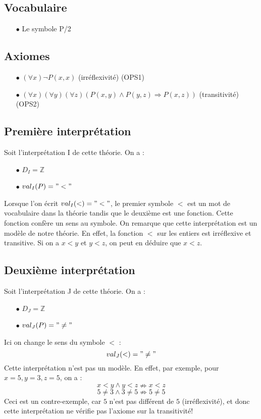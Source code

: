 \subsection*{Vocabulaire}
\begin{itemize}
\item[$\bullet$] Le symbole P/2
\end{itemize}
\subsection*{Axiomes}
\begin{itemize}
\item[$\bullet$] $ (\forall x) \neg P(x,x) $  (irréflexivité) (OPS1)
\item[$\bullet$] $ (\forall x) (\forall y) (\forall z) (P(x,y) \wedge P(y,z) \Rightarrow P(x,z))$ (transitivité) (OPS2)
\end{itemize}
\subsection*{Première interprétation}
Soit l'interprétation I de cette théorie. On a :
\begin{itemize}
\item[$\bullet$] $D_I = \mathbb{Z} $
\item[$\bullet$] $val_I (P) = "<"$
\end{itemize}
Lorsque l'on écrit $val_I(<) = "<"$, le premier symbole $<$ est un mot de vocabulaire dans la théorie tandis que le deuxième est une fonction. Cette fonction confère un sens au symbole. 
On remarque que cette interprétation est un modèle de notre théorie. En effet, la fonction $<$ sur les entiers est irréflexive et transitive. Si on a $x < y$ et $y <z$, on peut en déduire que $x<z$.
\subsection*{Deuxième interprétation}
Soit l'interprétation J de cette théorie. On a : 
\begin{itemize}
\item[$\bullet$] $D_J = \mathbb{Z} $
\item[$\bullet$] $val_J (P) = "\ne"$
\end{itemize}
Ici on change le sens du symbole $<$ :
$$val_J(<) = "\ne"$$
Cette interprétation n'est pas un modèle. En effet, par exemple, pour $x=5, y=3, z=5$, on a :
$$x<y \wedge y<z \nRightarrow x<z$$
$$5 \neq 3 \wedge 3 \neq 5 \nRightarrow 5 \neq 5$$
Ceci est un contre-exemple, car $5$ n'est pas différent de $5$ (irréflexivité), et donc cette interprétation ne vérifie pas l'axiome sur la transitivité!

